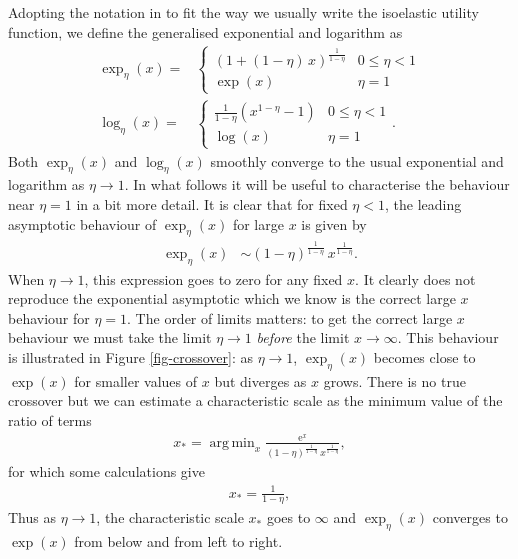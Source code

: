 \documentclass[11pt]{article}
\DeclareMathOperator*{\argmin}{arg\,min}
\begin{document}
\begin{multicols}{2}
Adopting the notation in \cite{yamano2002some} to fit the way we usually write the isoelastic utility function, we define the generalised exponential and logarithm as
\begin{align}
\label{eq:exp_eta}
\exp_\eta (x) = & \left\{
\begin{array}{ll} 
\left( 1 + (1-\eta)\,x\right)^\frac{1}{1-\eta} & \text{$0 \leq \eta < 1$}\\
\exp(x) & \text{$\eta=1$}
\end{array}
\right. \\
\label{eq:log_eta}
\log_\eta (x) = & \left\{
\begin{array}{ll} 
\frac{1}{1-\eta}\left( x^{1-\eta} -1 \right) &  \text{$0 \leq \eta < 1$}\\
\log(x) & \text{$\eta=1$}
\end{array}
\right. .
\end{align}
Both $\exp_\eta(x)$ and $\log_\eta(x)$ smoothly converge to the usual exponential and logarithm as $\eta \to 1$. In what follows it will be useful to characterise the behaviour near $\eta=1$ in a bit more detail. It is clear that for fixed $\eta<1$, the leading asymptotic behaviour of $\exp_\eta(x)$ for large $x$ is given by
\begin{align*}
\exp_\eta(x) &\sim (1 - \eta)^\frac{1}{1-\eta}\,x^\frac{1}{1-\eta}.
\end{align*}
When $\eta \to 1$, this expression goes to zero for any fixed $x$. It clearly does not reproduce the exponential asymptotic which we know is the correct large $x$ behaviour for $\eta = 1$. The order of limits matters: to get the correct large $x$ behaviour we must take the limit $\eta \to 1$ {\em before} the limit $x \to \infty$. This behaviour is illustrated in Figure \ref{fig-crossover}: as $\eta \to 1$, $\exp_\eta(x)$ becomes close to $\exp(x)$ for smaller values of $x$ but diverges as $x$ grows. There is no true crossover but we can estimate a characteristic scale as the minimum value of the ratio of terms
\begin{align*}
x_* = \argmin_{x} \frac{\mathrm{e}^x}{ (1 - \eta)^\frac{1}{1-\eta}\,x^\frac{1}{1-\eta}  },
\end{align*}
for which some calculations give
\begin{align}
\label{eq-crossover}
x_* = \frac{1}{1-\eta},
\end{align}
Thus as $\eta \to 1$, the characteristic scale $x_*$  goes to $\infty$ and $\exp_\eta(x)$ converges to $\exp(x)$ from below and from left to right. 


\end{multicols}
\end{document}
